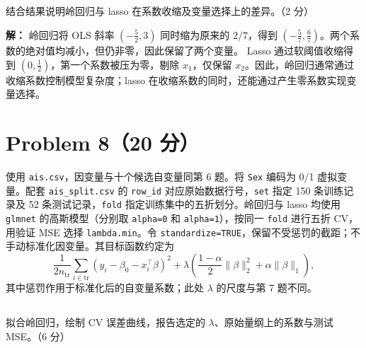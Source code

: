 \documentclass[12pt,a4paper]{article}
\begin{document}
\subsection{}

结合结果说明岭回归与 lasso 在系数收缩及变量选择上的差异。（2 分）

\begin{answerbox}
\textbf{解：}
岭回归将 OLS 斜率 $(-\frac52,3)$ 同时缩为原来的 $2/7$，得到 $(-\frac57,\frac67)$。两个系数的绝对值均减小，但仍非零，因此保留了两个变量。
Lasso 通过软阈值收缩得到 $(0,\frac12)$，第一个系数被压为零，剔除 $x_1$，仅保留 $x_2$。因此，岭回归通常通过收缩系数控制模型复杂度；lasso 在收缩系数的同时，还能通过产生零系数实现变量选择。
\end{answerbox}

\section{Problem 8（20 分）}

使用 \texttt{ais.csv}，因变量与十个候选自变量同第 6 题。将 \texttt{Sex} 编码为 0/1 虚拟变量。配套 \texttt{ais\_split.csv} 的 \texttt{row\_id} 对应原始数据行号，\texttt{set} 指定 150 条训练记录及 52 条测试记录，\texttt{fold} 指定训练集中的五折划分。岭回归与 lasso 均使用 \texttt{glmnet} 的高斯模型（分别取 \texttt{alpha=0} 和 \texttt{alpha=1}），按同一 \texttt{fold} 进行五折 CV，用验证 MSE 选择 \texttt{lambda.min}。令 \texttt{standardize=TRUE}，保留不受惩罚的截距；不手动标准化因变量。其目标函数约定为
\[
\frac{1}{2n_{\mathrm{tr}}}\sum_{i\in\mathrm{tr}}(y_i-\beta_0-x_i^{\top}\beta)^2+\lambda\left(\frac{1-\alpha}{2}\lVert\beta\rVert_2^2+\alpha\lVert\beta\rVert_1\right),
\]
其中惩罚作用于标准化后的自变量系数；此处 $\lambda$ 的尺度与第 7 题不同。

\subsection{}

拟合岭回归，绘制 CV 误差曲线，报告选定的 $\lambda$、原始量纲上的系数与测试 MSE。（6 分）
\end{document}
